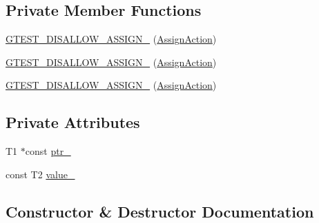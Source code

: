 \subsection*{Private Member Functions}
\begin{DoxyCompactItemize}
\item 
\mbox{\hyperlink{classtesting_1_1internal_1_1_assign_action_af69bcf574c5453e4120fc770d604ddaa}{G\+T\+E\+S\+T\+\_\+\+D\+I\+S\+A\+L\+L\+O\+W\+\_\+\+A\+S\+S\+I\+G\+N\+\_\+}} (\mbox{\hyperlink{classtesting_1_1internal_1_1_assign_action}{Assign\+Action}})
\item 
\mbox{\hyperlink{classtesting_1_1internal_1_1_assign_action_af69bcf574c5453e4120fc770d604ddaa}{G\+T\+E\+S\+T\+\_\+\+D\+I\+S\+A\+L\+L\+O\+W\+\_\+\+A\+S\+S\+I\+G\+N\+\_\+}} (\mbox{\hyperlink{classtesting_1_1internal_1_1_assign_action}{Assign\+Action}})
\item 
\mbox{\hyperlink{classtesting_1_1internal_1_1_assign_action_af69bcf574c5453e4120fc770d604ddaa}{G\+T\+E\+S\+T\+\_\+\+D\+I\+S\+A\+L\+L\+O\+W\+\_\+\+A\+S\+S\+I\+G\+N\+\_\+}} (\mbox{\hyperlink{classtesting_1_1internal_1_1_assign_action}{Assign\+Action}})
\end{DoxyCompactItemize}
\subsection*{Private Attributes}
\begin{DoxyCompactItemize}
\item 
T1 $\ast$const \mbox{\hyperlink{classtesting_1_1internal_1_1_assign_action_a0821776ad1361b83771e6cdb25693d36}{ptr\+\_\+}}
\item 
const T2 \mbox{\hyperlink{classtesting_1_1internal_1_1_assign_action_a6b76b6b0b0483f2918dab3f2df960dce}{value\+\_\+}}
\end{DoxyCompactItemize}


\subsection{Constructor \& Destructor Documentation}
\mbox{\label{classtesting_1_1internal_1_1_assign_action_ae5a8fe8954ff3f8b26a08b57c3afdf9a}} 
